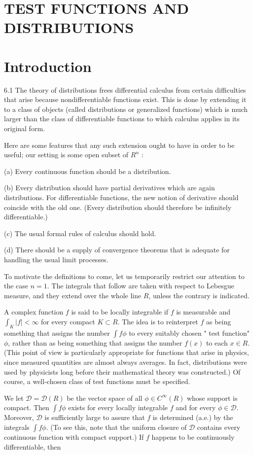 \documentclass[10pt]{article}
\begin{document}
\section{TEST FUNCTIONS AND DISTRIBUTIONS}
\section{Introduction}
6.1 The theory of distributions frees differential calculus from certain difficulties that arise because nondifferentiable functions exist. This is done by extending it to a class of objects (called distributions or generalized functions) which is much larger than the class of differentiable functions to which calculus applies in its original form.

Here are some features that any such extension ought to have in order to be useful; our setting is some open subset of $R^{n}$ :

(a) Every continuous function should be a distribution.

(b) Every distribution should have partial derivatives which are again distributions. For differentiable functions, the new notion of derivative should coincide with the old one. (Every distribution should therefore be infinitely differentiable.)

(c) The usual formal rules of calculus should hold.

(d) There should be a supply of convergence theorems that is adequate for handling the usual limit processes.

To motivate the definitions to come, let us temporarily restrict our attention to the case $n=1$. The integrals that follow are taken with respect to Lebesgue measure, and they extend over the whole line $R$, unless the contrary is indicated.

A complex function $f$ is said to be locally integrable if $f$ is measurable and $\int_{K}|f|<\infty$ for every compact $K \subset R$. The idea is to reinterpret $f$ as being something that assigns the number $\int f \phi$ to every suitably chosen " test function" $\phi$, rather than as being something that assigns the number $f(x)$ to each $x \in R$. (This point of view is particularly appropriate for functions that arise in physics, since measured quantities are almost always averages. In fact, distributions were used by physicists long before their mathematical theory was constructed.) Of course, a well-chosen class of test functions must be specified.

We let $\mathscr{D}=\mathscr{D}(R)$ be the vector space of all $\phi \in C^{\infty}(R)$ whose support is compact. Then $\int f \phi$ exists for every locally integrable $f$ and for every $\phi \in \mathscr{D}$. Moreover, $\mathscr{D}$ is sufficiently large to assure that $f$ is determined (a.e.) by the integrals $\int f \phi$. (To see this, note that the uniform closure of $\mathscr{D}$ contains every continuous function with compact support.) If $f$ happens to be continuously differentiable, then
\end{document}
